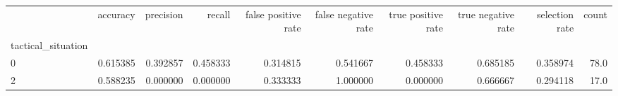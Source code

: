\begin{tabular}{lrrrrrrrrr}
\toprule
{} &  accuracy &  precision &    recall &  false positive rate &  false negative rate &  true positive rate &  true negative rate &  selection rate &  count \\
tactical\_situation &           &            &           &                      &                      &                     &                     &                 &        \\
\midrule
0                  &  0.615385 &   0.392857 &  0.458333 &             0.314815 &             0.541667 &            0.458333 &            0.685185 &        0.358974 &   78.0 \\
2                  &  0.588235 &   0.000000 &  0.000000 &             0.333333 &             1.000000 &            0.000000 &            0.666667 &        0.294118 &   17.0 \\
\bottomrule
\end{tabular}
